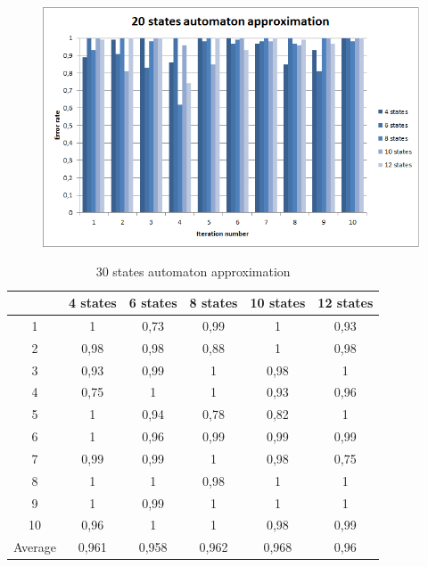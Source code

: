 \documentclass[runningheads,a4paper]{llncs}
\begin{document}
\begin{figure}
\centering
\includegraphics[scale=1]{7.png}
\end{figure}

\begin{table}[]
\centering
\caption{30 states automaton approximation}
\label{my-label}
\begin{tabular}{@{}cccccc@{}}
\toprule
        & 4 states & 6 states & 8 states & 10 states & 12 states    \\ \midrule
1       & 1        & 0,73     & 0,99     & 1         & 0,93 \\
2       & 0,98     & 0,98     & 0,88     & 1         & 0,98 \\
3       & 0,93     & 0,99     & 1        & 0,98      & 1 \\
4       & 0,75     & 1        & 1        & 0,93      & 0,96   \\
5       & 1        & 0,94     & 0,78     & 0,82      & 1   \\
6       & 1        & 0,96     & 0,99     & 0,99      & 0,99    \\
7       & 0,99     & 0,99     & 1        & 0,98      & 0,75    \\
8       & 1        & 1        & 0,98     & 1         & 1    \\
9       & 1        & 0,99     & 1        & 1         & 1 \\
10      & 0,96     & 1        & 1        & 0,98      & 0,99  \\
Average & 0,961    & 0,958    & 0,962    & 0,968     & 0,96  \\ \bottomrule
\end{tabular}
\end{table}
\end{document}
